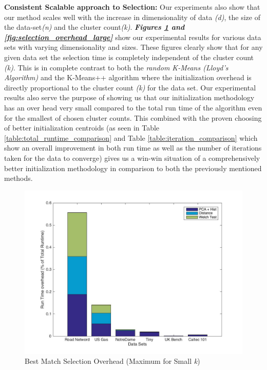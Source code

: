 \textbf{Consistent Scalable approach to Selection:} Our experiments also show that our method scales well with the increase in dimensionality of data \textit{(d)}, the size of the data-set\textit{(n)} and the cluster count\textit{(k)}. \textbf{\textit{Figures \ref{fig:selection_overhead} and \ref{fig:selection_overhead_large}}} show our experimental results for various data sets with varying dimensionality and sizes. These figures clearly show that for any given data set the selection time is completely independent of the cluster count \textit{(k)}. This is in complete contrast to both the  \textit{random K-Means (Lloyd's Algorithm)} and the K-Means++ algorithm where the initialization overhead is directly proportional to the cluster count \textit{(k)} for the data set. Our experimental results also serve the purpose of showing us that our initialization methodology has an over head very small compared to the total run time of the algorithm even for the smallest of chosen cluster counts. This combined with the proven choosing of better initialization centroids (as seen in Table \ref{table:total_runtime_comparison} and Table \ref{table:iteration_comparison} which show an overall improvement in both run time as well as the number of iterations taken for the data to converge) gives us a win-win situation of a comprehensively better initialization methodology in comparison to both the previously mentioned methods.


\begin{figure}[t!]
    \includegraphics[width=\textwidth]{Chapter-5/figs/stacked_overhead}
    \caption{Best Match Selection Overhead (Maximum for Small \textit{k})}
    \centering
    \label{fig:selection_overhead}
\end{figure}

